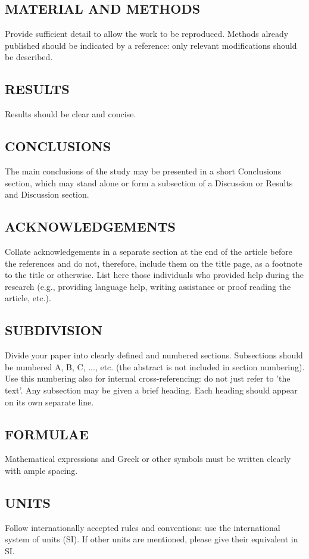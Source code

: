 \documentclass{ieeeijc}
\begin{document}
\subsection{MATERIAL AND METHODS}
Provide sufficient detail to allow the work to be reproduced. Methods already published should be indicated by a reference: only relevant modifications should be described.

\subsection{RESULTS}
Results should be clear and concise.

\subsection{CONCLUSIONS}
The main conclusions of the study may be presented in a short Conclusions section, which may stand alone or form a subsection of a Discussion or Results and Discussion section.

\subsection{ACKNOWLEDGEMENTS}
Collate acknowledgements in a separate section at the end of the article before the references and do not, therefore, include them on the title page, as a footnote to the title or otherwise. List here those individuals who provided help during the research (e.g., providing language help, writing assistance or proof reading the article, etc.).

\subsection{SUBDIVISION}
Divide your paper into clearly defined and numbered sections. Subsections should be numbered A, B, C, ..., etc. (the abstract is not included in section numbering). Use this numbering also for internal cross-referencing: do not just refer to 'the text'. Any subsection may be given a brief heading. Each heading should appear on its own separate line.

\subsection{FORMULAE}
Mathematical expressions and Greek or other symbols must be written clearly with ample spacing.

\subsection{UNITS}
Follow internationally accepted rules and conventions: use the international system of units (SI). If other units are mentioned, please give their equivalent in SI.
\end{document}
